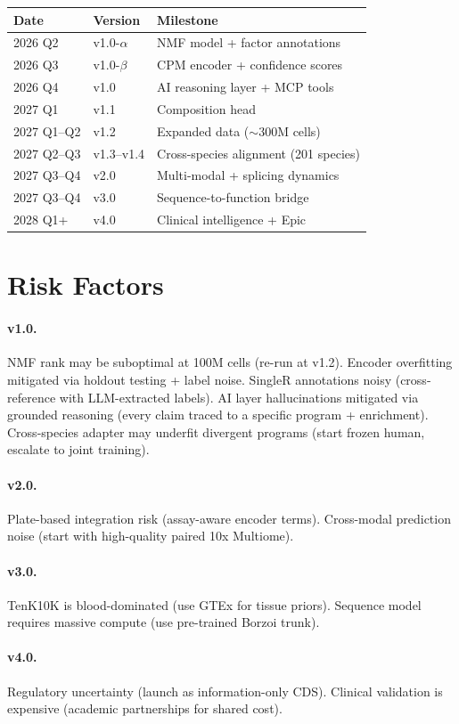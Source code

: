 \documentclass[10pt,twocolumn,letterpaper]{article}
\begin{document}
\begin{table}[h]
\centering\small
\begin{tabular}{@{}lll@{}}
\toprule
Date & Version & Milestone \\
\midrule
2026 Q2 & v1.0-$\alpha$ & NMF model + factor annotations \\
2026 Q3 & v1.0-$\beta$ & CPM encoder + confidence scores \\
2026 Q4 & v1.0 & AI reasoning layer + MCP tools \\
2027 Q1 & v1.1 & Composition head \\
2027 Q1--Q2 & v1.2 & Expanded data (${\sim}300$M cells) \\
2027 Q2--Q3 & v1.3--v1.4 & Cross-species alignment (201 species) \\
2027 Q3--Q4 & v2.0 & Multi-modal + splicing dynamics \\
2027 Q3--Q4 & v3.0 & Sequence-to-function bridge \\
2028 Q1+ & v4.0 & Clinical intelligence + Epic \\
\bottomrule
\end{tabular}
\end{table}

\section{Risk Factors}

\paragraph{v1.0.} NMF rank may be suboptimal at 100M cells (re-run at v1.2).
Encoder overfitting mitigated via holdout testing + label noise. SingleR
annotations noisy (cross-reference with LLM-extracted labels). AI layer
hallucinations mitigated via grounded reasoning (every claim traced to a
specific program + enrichment). Cross-species adapter may underfit divergent
programs (start frozen human, escalate to joint training).

\paragraph{v2.0.} Plate-based integration risk (assay-aware encoder terms).
Cross-modal prediction noise (start with high-quality paired 10x Multiome).

\paragraph{v3.0.} TenK10K is blood-dominated (use GTEx for tissue priors).
Sequence model requires massive compute (use pre-trained Borzoi trunk).

\paragraph{v4.0.} Regulatory uncertainty (launch as information-only CDS).
Clinical validation is expensive (academic partnerships for shared cost).


\end{document}
